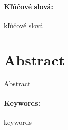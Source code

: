 \documentclass[12pt, oneside]{book}
\begin{document}
\paragraph*{Kľúčové slová:} kľúčové slová


\newpage 
\section*{Abstract}

Abstract


\paragraph*{Keywords:} keywords


%
%



\newpage 

\tableofcontents



\newpage 

\listoffigures


\mainmatter


 






\newpage	

\backmatter
\end{document}
